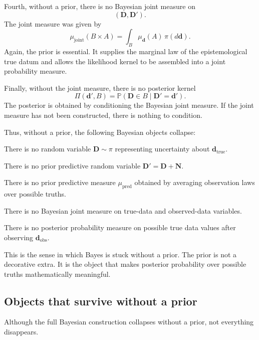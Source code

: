 \documentclass[11pt]{article}
\newcommand{\prior}{\pi}
\newcommand{\Drand}{\mathbf D}
\newcommand{\Dobsrand}{\mathbf D'}
\newcommand{\Nrand}{\mathbf N}
\newcommand{\dtrue}{\mathbf d_{\mathrm{true}}}
\newcommand{\dobs}{\mathbf d_{\mathrm{obs}}}
\newcommand{\Prob}{\mathbb P}
\begin{document}
Fourth, without a prior, there is no Bayesian joint measure on
\[
    (\Drand,\Dobsrand).
\]
The joint measure was given by
\[
    \mu_{\mathrm{joint}}(B\times A)
    =
    \int_B
        \mu_{\mathbf d}(A)
    \,\prior(d\mathbf d).
\]
Again, the prior is essential. It supplies the marginal law of the epistemological true datum and allows the likelihood kernel to be assembled into a joint probability measure.

Finally, without the joint measure, there is no posterior kernel
\[
    \Pi(\mathbf d',B)
    =
    \Prob(\Drand\in B\mid \Dobsrand=\mathbf d').
\]
The posterior is obtained by conditioning the Bayesian joint measure. If the joint measure has not been constructed, there is nothing to condition.

Thus, without a prior, the following Bayesian objects collapse:
\begin{description}[leftmargin=3.2cm,style=nextline]
    \item[Epistemological truth.]
    There is no random variable \(\Drand\sim\prior\) representing uncertainty about \(\dtrue\).

    \item[Bayesian predictive datum.]
    There is no prior predictive random variable \(\Dobsrand=\Drand+\Nrand\).

    \item[Prior predictive law.]
    There is no prior predictive measure \(\mu_{\mathrm{pred}}\) obtained by averaging observation laws over possible truths.

    \item[Joint measure.]
    There is no Bayesian joint measure on true-data and observed-data variables.

    \item[Posterior kernel.]
    There is no posterior probability measure on possible true data values after observing \(\dobs\).
\end{description}

This is the sense in which Bayes is stuck without a prior. The prior is not a decorative extra. It is the object that makes posterior probability over possible truths mathematically meaningful.

\subsection{Objects that survive without a prior}

Although the full Bayesian construction collapses without a prior, not everything disappears.
\end{document}
